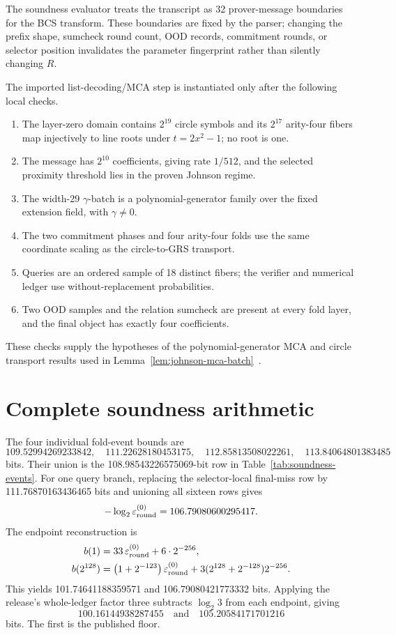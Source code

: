 The soundness evaluator treats the transcript as 32 prover-message
boundaries for the BCS transform.  These boundaries are fixed by the parser;
changing the prefix shape, sumcheck round count, OOD records, commitment
rounds, or selector position invalidates the parameter fingerprint rather
than silently changing \(R\).

The imported list-decoding/MCA step is instantiated only after the following
local checks.
\begin{enumerate}
  \item The layer-zero domain contains \(2^{19}\) circle symbols and its
        \(2^{17}\) arity-four fibers map injectively to line roots under
        \(t=2x^2-1\); no root is one.
  \item The message has \(2^{10}\) coefficients, giving rate \(1/512\), and
        the selected proximity threshold lies in the proven Johnson regime.
  \item The width-29 \(\gamma\)-batch is a polynomial-generator family over
        the fixed extension field, with \(\gamma\ne0\).
  \item The two commitment phases and four arity-four folds use the same
        coordinate scaling as the circle-to-GRS transport.
  \item Queries are an ordered sample of 18 distinct fibers; the verifier and
        numerical ledger use without-replacement probabilities.
  \item Two OOD samples and the relation sumcheck are present at every fold
        layer, and the final object has exactly four coefficients.
\end{enumerate}
These checks supply the hypotheses of the polynomial-generator MCA and circle
transport results used in
Lemma~\ref{lem:johnson-mca-batch}~\cite{BordageChiesaGuanManzur2025,CarmonEtAl2026Stwo}.

\section{Complete soundness arithmetic}
\label{app:soundness-ledger}

The four individual fold-event bounds are
\[
 109.52994269233842,\quad
 111.22628180453175,\quad
 112.85813508022261,\quad
 113.84064801383485
\]
bits.  Their union is the 108.98543226575069-bit row in
Table~\ref{tab:soundness-events}.  For one query branch, replacing the
selector-local final-miss row by 111.76870163436465 bits and unioning all
sixteen rows gives
\[
 -\log_2\varepsilon_{\rm round}^{(0)}
 =106.79080600295417.
\]
The endpoint reconstruction is
\begin{align*}
 b(1)
  &=33\,\varepsilon_{\rm round}^{(0)}+6\cdot2^{-256},\\
 b(2^{128})
  &=\left(1+2^{-123}\right)\varepsilon_{\rm round}^{(0)}
    +3(2^{128}+2^{-128})2^{-256}.
\end{align*}
This yields 101.74641188359571 and 106.79080421773332 bits.  Applying the
release's whole-ledger factor three subtracts \(\log_2 3\) from each endpoint,
giving
\[
 100.16144938287455\quad\text{and}\quad105.20584171701216
\]
bits.  The first is the published floor.

